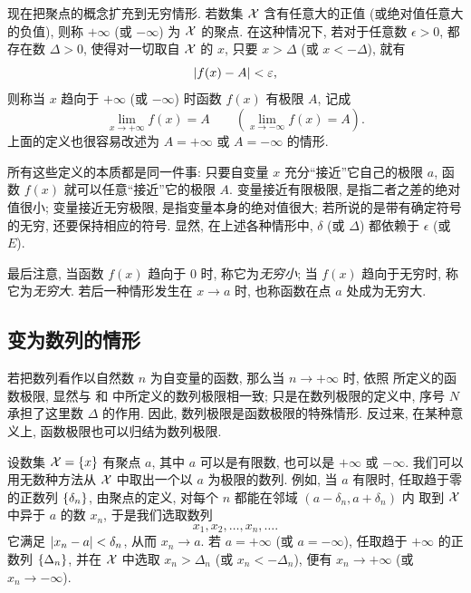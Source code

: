 现在把聚点的概念扩充到无穷情形.
{\kaishu 若数集 $\mathcal{X}$ 含有任意大的正值 (或绝对值任意大的负值),
则称 $+\infty$ (或 $-\infty$) 为 $\mathcal{X}$ 的聚点.}
在这种情况下, {\kaishu 若对于任意数 $\epsilon>0$, 都存在数 $\Delta>0$,
使得对一切取自 $\mathcal{X}$ 的 $x$, 只要 $x>\Delta$ (或 $x<-\Delta$), 就有
\begin{equation}\label{eq:function_limit_at_infinity}
\left| f(x)-A \right|<\varepsilon,
\end{equation}
则称当 $x$ 趋向于 $+\infty$ (或 $-\infty$) 时函数 $f(x)$ 有极限 $A$, 记成
\begin{equation}\label{eq:function_limit_at_infinity_notation}
\lim_{x\to+\infty}f(x)=A
\qquad\left(\lim_{x\to-\infty}f(x)=A\right).
\end{equation}}
上面的定义也很容易改述为 $A=+\infty$ 或 $A=-\infty$ 的情形.

所有这些定义的本质都是同一件事:
只要自变量 $x$ 充分“接近”它自己的极限 $a$,
函数 $f(x)$ 就可以任意“接近”它的极限 $A$.
变量接近有限极限, 是指二者之差的绝对值很小;
变量接近无穷极限, 是指变量本身的绝对值很大;
若所说的是带有确定符号的无穷, 还要保持相应的符号.
显然, 在上述各种情形中, $\delta$ (或 $\Delta$) 都依赖于 $\epsilon$ (或 $E$).

最后注意, 当函数 $f(x)$ 趋向于 $0$ 时, 称它为\emph{无穷小};
当 $f(x)$ 趋向于无穷时, 称它为\emph{无穷大}.
若后一种情形发生在 $x\to a$ 时, 也称函数在点 $a$ 处成为无穷大.

\subsection{变为数列的情形}\label{subsec:53}
若把数列看作以自然数 $n$ 为自变量的函数,
那么当 $n\to+\infty$ 时, 依照  所定义的函数极限,
显然与  和  中所定义的数列极限相一致;
只是在数列极限的定义中, 序号 $N$ 承担了这里数 $\Delta$ 的作用.
因此, {\kaishu 数列极限是函数极限的特殊情形.}
反过来, 在某种意义上, 函数极限也可以归结为数列极限.

设数集 $\mathcal{X}=\{x\}$ 有聚点 $a$,
其中 $a$ 可以是有限数, 也可以是 $+\infty$ 或 $-\infty$.
我们可以用无数种方法从 $\mathcal{X}$ 中取出一个以 $a$ 为极限的数列.
例如, 当 $a$ 有限时, 任取趋于零的正数列 $\{\delta_{n}\}$,
由聚点的定义, 对每个 $n$ 都能在邻域 $(a-\delta_n,a+\delta_n)$ 内
取到 $\mathcal{X}$ 中异于 $a$ 的数 $x_n$,
于是我们选取数列
\begin{equation}\label{eq:domain_sequence_approaching_cluster_point}
x_1,x_2,\ldots,x_n,\ldots.
\end{equation}
它满足 $\left| x_n-a \right|<\delta_n$, 从而 $x_n\to a$.
若 $a=+\infty$ (或 $a=-\infty$), 任取趋于 $+\infty$ 的正数列 $\{\Delta_{n}\}$,
并在 $\mathcal{X}$ 中选取 $x_n>\Delta_n$ (或 $x_n<-\Delta_n$),
便有 $x_n\to+\infty$ (或 $x_n\to-\infty$).

